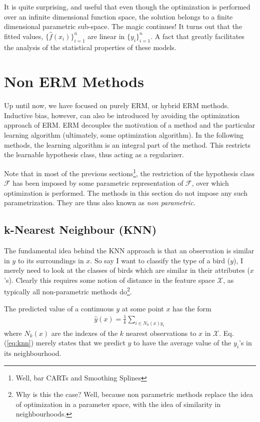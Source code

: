 \documentclass[12pt,a4paper]{article}
\theoremstyle{plain}
\theoremstyle{definition}
\newcommand{\hyp}{f}
\newcommand{\hypclass}{\mathcal{F}}
\newcommand{\featureS}{\mathcal{X}}
\begin{document}
It is quite surprising, and useful that even though the optimization is performed over an infinite dimensional function space, the solution belongs to a finite dimensional parametric sub-space. 
The magic continues! It turns out that the fitted values, $\{\hat{\hyp}(x_i)\}_{i=1}^n$ are linear in $\{y_i\}_{i=1}^n$. A fact that greatly facilitates the analysis of the statistical properties of these models.





\section{Non ERM Methods}
\label{sec:non_erm}
Up until now, we have focused on purely ERM, or hybrid ERM methods.
Inductive bias, however, can also be introduced by avoiding the optimization approach of ERM.
ERM decouples the motivation of a method and the particular learning algorithm (ultimately, some optimization algorithm).
In the following methods, the learning algorithm is an integral part of the method. 
This restricts the learnable hypothesis class, thus acting as a regularizer.

Note that in most of the previous sections\footnote{Well, bar CARTs and Smoothing Splines}, the restriction of the hypothesis class $\hypclass$ has been imposed by some parametric representation of $\hypclass$, over which optimization is performed.
The methods in this section do not impose any such parametrization. They are thus also known as \emph{non parametric}.



\subsection{k-Nearest Neighbour (KNN)}
\label{sec:knn}
The fundamental idea behind the KNN approach is that an observation is similar in $y$ to its surroundings in $x$. 
So say I want to classify the type of a bird ($y$), I merely need to look at the classes of birds which are similar in their attributes ($x$'s). 
Clearly this requires some notion of distance in the feature space $\featureS$, as typically all non-parametric methods do\footnote{Why is this the case? Well, because non parametric methods replace the idea of optimization in a parameter space, with the idea of similarity in neighbourhoods.}.

The predicted value of a continuous $y$ at some point $x$ has the form
\begin{align}
\label{eq:knn}
	\hat{y}(x)=\frac{1}{k}\sum_{i \in N_k(x) y_i}
\end{align}
where $N_k(x)$ are the indexes of the $k$ nearest observations to $x$ in $\featureS$.
Eq.(\ref{eq:knn}) merely states that we predict $y$ to have the average value of the $y_i$'s in its neighbourhood.
\end{document}
